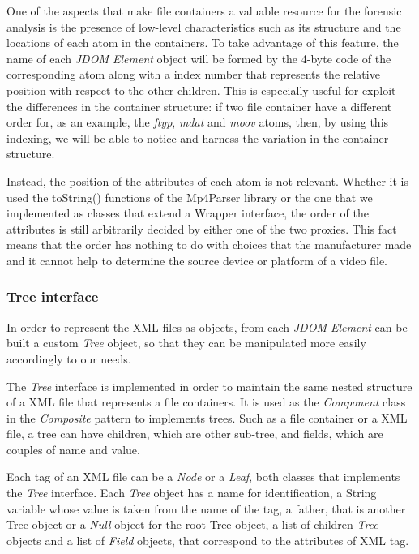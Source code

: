 One of the aspects that make file containers a valuable resource for the forensic analysis is the presence of low-level characteristics such as its structure and the locations of each atom in the containers. To take advantage of this feature, the name of each \emph{JDOM Element} object will be formed by the 4-byte code of the corresponding atom along with a index number that represents the relative position with respect to the other children. This is especially useful for exploit the differences in the container structure: if two file container have a different order for, as an example, the \emph{ftyp}, \emph{mdat} and \emph{moov} atoms, then, by using this indexing, we will be able to notice and harness the variation in the container structure.

Instead, the position of the attributes of each atom is not relevant. Whether it is used the toString() functions of the Mp4Parser library or the one that we implemented as classes that extend a Wrapper interface, the order of the attributes is still arbitrarily decided by either one of the two proxies. This fact means that the order has nothing to do with choices that the manufacturer made and it cannot help to determine the source device or platform of a video file.

\subsubsection{Tree interface}

In order to represent the XML files as objects, from each \emph{JDOM Element} can be built a custom \emph{Tree} object, so that they can be manipulated more easily accordingly to our needs.

The \emph{Tree} interface is implemented in order to maintain the same nested structure of a XML file that represents a file containers. It is used as the \emph{Component} class in the \emph{Composite} pattern to implements trees. Such as a file container or a XML file, a tree can have children, which are other sub-tree, and fields, which are couples of name and value.

Each tag of an XML file can be a \emph{Node} or a \emph{Leaf}, both classes that implements the \emph{Tree} interface. Each \emph{Tree} object has a name for identification, a String variable whose value is taken from the name of the tag, a father, that is another Tree object or a \emph{Null} object for the root Tree object, a list of children \emph{Tree} objects and a list of \emph{Field} objects, that correspond to the attributes of XML tag.

